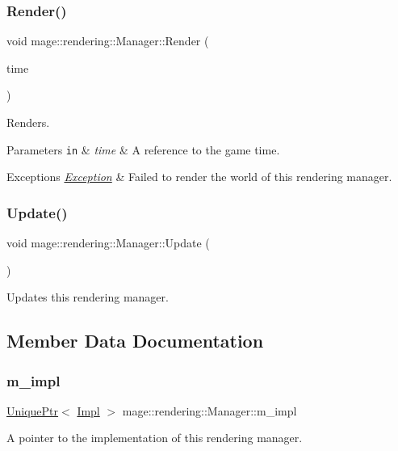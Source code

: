 \subsubsection{\texorpdfstring{Render()}{Render()}}
{\footnotesize\ttfamily void mage\+::rendering\+::\+Manager\+::\+Render (\begin{DoxyParamCaption}\item[{const \mbox{\hyperlink{classmage_1_1_game_time}{Game\+Time}} \&}]{time }\end{DoxyParamCaption})}

Renders.


\begin{DoxyParams}[1]{Parameters}
\mbox{\tt in}  & {\em time} & A reference to the game time. \\
\hline
\end{DoxyParams}

\begin{DoxyExceptions}{Exceptions}
{\em \mbox{\hyperlink{classmage_1_1_exception}{Exception}}} & Failed to render the world of this rendering manager. \\
\hline
\end{DoxyExceptions}
\mbox{\label{classmage_1_1rendering_1_1_manager_a878849c66920ccef910b31c80b1f033c}} 
\subsubsection{\texorpdfstring{Update()}{Update()}}
{\footnotesize\ttfamily void mage\+::rendering\+::\+Manager\+::\+Update (\begin{DoxyParamCaption}{ }\end{DoxyParamCaption})}

Updates this rendering manager. 

\subsection{Member Data Documentation}
\mbox{\label{classmage_1_1rendering_1_1_manager_a1fa26fd6393941f4ef9b6863f317cd29}} 
\subsubsection{\texorpdfstring{m\+\_\+impl}{m\_impl}}
{\footnotesize\ttfamily \mbox{\hyperlink{namespacemage_a3316d7143a973e37adf1110f2e80ca31}{Unique\+Ptr}}$<$ \mbox{\hyperlink{classmage_1_1rendering_1_1_manager_1_1_impl}{Impl}} $>$ mage\+::rendering\+::\+Manager\+::m\+\_\+impl\hspace{0.3cm}{\ttfamily [private]}}

A pointer to the implementation of this rendering manager. 